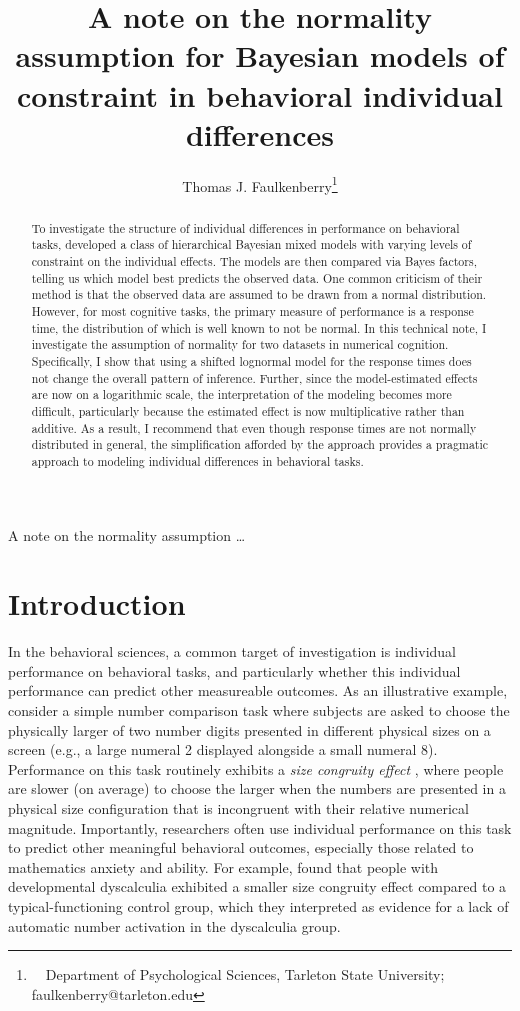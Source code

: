 \documentclass[12pt,twoside,a4paper]{article}
\title{A note on the normality assumption for Bayesian models of constraint in behavioral individual differences}
\author{
  Thomas J. Faulkenberry\thanks{~~Department of Psychological Sciences, Tarleton State University; faulkenberry@tarleton.edu}
}
\date{ }
\begin{document}
\maketitle

         {A note on the normality assumption \ldots}

\begin{abstract}
\setcounter{footnote}{1}
To investigate the structure of individual differences in performance on behavioral tasks, \citet{haaf2017} developed a class of hierarchical Bayesian mixed models with varying levels of constraint on the individual effects. The models are then compared via Bayes factors, telling us which model best predicts the observed data. One common criticism of their method is that the observed data are assumed to be drawn from a normal distribution. However, for most cognitive tasks, the primary measure of performance is a response time, the distribution of which is well known to not be normal. In this technical note, I investigate the assumption of normality for two datasets in numerical cognition. Specifically, I show that using a shifted lognormal model for the response times does not change the overall pattern of inference. Further, since the model-estimated effects are now on a logarithmic scale, the interpretation of the modeling becomes more difficult, particularly because the estimated effect is now multiplicative rather than additive. As a result, I recommend that even though response times are not normally distributed in general, the simplification afforded by the \citet{haaf2017} approach provides a pragmatic approach to modeling individual differences in behavioral tasks.
\end{abstract}


\section{Introduction}

In the behavioral sciences, a common target of investigation is individual performance on behavioral tasks, and particularly whether this individual performance can predict other measureable outcomes. As an illustrative example, consider a simple number comparison task where subjects are asked to choose the physically larger of two number digits presented in different physical sizes on a screen (e.g., a large numeral 2 displayed alongside a small numeral 8). Performance on this task routinely exhibits a \emph{size congruity effect} \citep{henik1982}, where people are slower (on average) to choose the larger when the numbers are presented in a physical size configuration that is incongruent with their relative numerical magnitude. Importantly, researchers often use individual performance on this task to predict other meaningful behavioral outcomes, especially those related to mathematics anxiety and ability. For example, \citet{rubinsten2005} found that people with developmental dyscalculia exhibited a smaller size congruity effect compared to a typical-functioning control group, which they interpreted as evidence for a lack of automatic number activation in the dyscalculia group.\\
\end{document}
